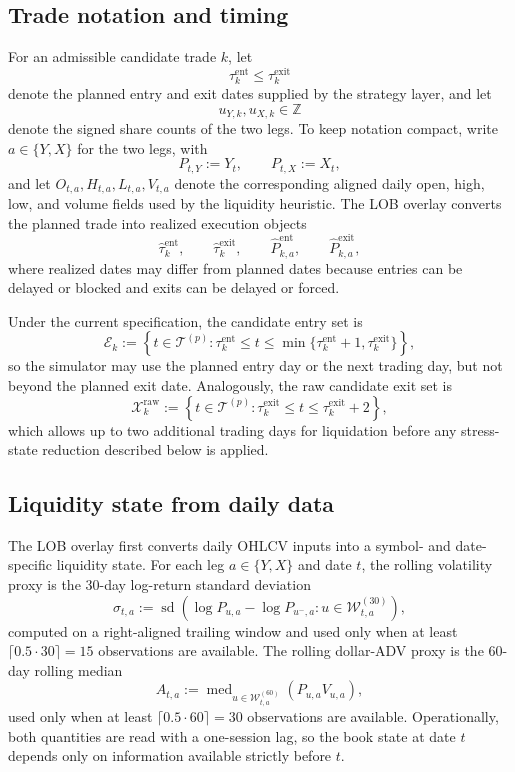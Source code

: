\documentclass[11pt,a4paper]{article}
\begin{document}
\subsection{Trade notation and timing}

For an admissible candidate trade \(k\), let
\[
  \tau_k^{\mathrm{ent}}
  \le
  \tau_k^{\mathrm{exit}}
\]
denote the planned entry and exit dates supplied by the strategy layer, and let
\[
  u_{Y,k},u_{X,k}\in\mathbb Z
\]
denote the signed share counts of the two legs. To keep notation compact, write
\(a\in\{Y,X\}\) for the two legs, with
\[
  P_{t,Y}:=Y_t,
  \qquad
  P_{t,X}:=X_t,
\]
and let \(O_{t,a},H_{t,a},L_{t,a},V_{t,a}\) denote the corresponding aligned
daily open, high, low, and volume fields used by the liquidity heuristic. The
LOB overlay converts the planned trade into realized execution objects
\[
  \widehat\tau_k^{\mathrm{ent}},
  \qquad
  \widehat\tau_k^{\mathrm{exit}},
  \qquad
  \widehat P_{k,a}^{\mathrm{ent}},
  \qquad
  \widehat P_{k,a}^{\mathrm{exit}},
\]
where realized dates may differ from planned dates because entries can be
delayed or blocked and exits can be delayed or forced.

Under the current specification, the candidate entry set is
\[
  \mathcal E_k
  :=
  \left\{
    t\in\mathcal T^{(p)}:
    \tau_k^{\mathrm{ent}}
    \le t
    \le
    \min\{\tau_k^{\mathrm{ent}}+1,\tau_k^{\mathrm{exit}}\}
  \right\},
\]
so the simulator may use the planned entry day or the next trading day, but not
beyond the planned exit date. Analogously, the raw candidate exit set is
\[
  \mathcal X_k^{\mathrm{raw}}
  :=
  \left\{
    t\in\mathcal T^{(p)}:
    \tau_k^{\mathrm{exit}}
    \le t
    \le \tau_k^{\mathrm{exit}}+2
  \right\},
\]
which allows up to two additional trading days for liquidation before any
stress-state reduction described below is applied.

\subsection{Liquidity state from daily data}

The LOB overlay first converts daily OHLCV inputs into a symbol- and
date-specific liquidity state. For each leg \(a\in\{Y,X\}\) and date \(t\), the
rolling volatility proxy is the \(30\)-day log-return standard deviation
\[
  \sigma_{t,a}
  :=
  \operatorname{sd}
  \left(
    \log P_{u,a} - \log P_{u^{-},a}
    :
    u\in \mathcal W_{t,a}^{(30)}
  \right),
\]
computed on a right-aligned trailing window and used only when at least
\(\lceil 0.5\cdot 30\rceil = 15\) observations are available. The rolling
dollar-ADV proxy is the \(60\)-day rolling median
\[
  A_{t,a}
  :=
  \operatorname{med}_{u\in\mathcal W_{t,a}^{(60)}}
  \left(P_{u,a}V_{u,a}\right),
\]
used only when at least \(\lceil 0.5\cdot 60\rceil = 30\) observations are
available. Operationally, both quantities are read with a one-session lag, so
the book state at date \(t\) depends only on information available strictly
before \(t\).
\end{document}
